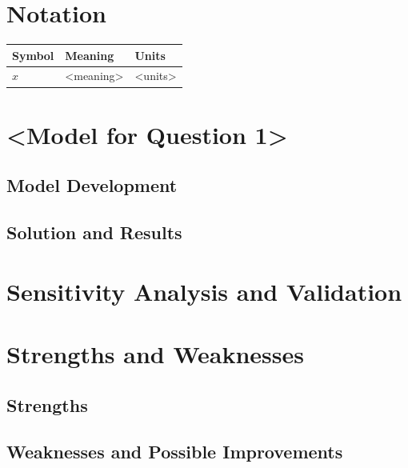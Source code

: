 \documentclass[12pt]{article}
\begin{document}
\section{Notation}
\begin{table}[H]\centering
\begin{tabular}{@{}lll@{}}\toprule
Symbol & Meaning & Units \\\midrule
$x$ & <meaning> & <units> \\
\bottomrule\end{tabular}
\end{table}

\section{<Model for Question 1>}
\subsection{Model Development}
\subsection{Solution and Results}

\section{Sensitivity Analysis and Validation}

\section{Strengths and Weaknesses}
\subsection{Strengths}
\subsection{Weaknesses and Possible Improvements}

\end{document}
